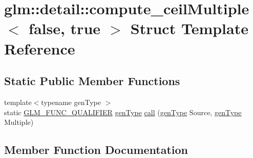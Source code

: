 \hypertarget{structglm_1_1detail_1_1compute__ceil_multiple_3_01false_00_01true_01_4}{}\section{glm\+:\+:detail\+:\+:compute\+\_\+ceil\+Multiple$<$ false, true $>$ Struct Template Reference}
\label{structglm_1_1detail_1_1compute__ceil_multiple_3_01false_00_01true_01_4}
\subsection*{Static Public Member Functions}
\begin{DoxyCompactItemize}
\item 
{\footnotesize template$<$typename gen\+Type $>$ }\\static \hyperlink{setup_8hpp_a33fdea6f91c5f834105f7415e2a64407}{G\+L\+M\+\_\+\+F\+U\+N\+C\+\_\+\+Q\+U\+A\+L\+I\+F\+I\+ER} \hyperlink{structglm_1_1detail_1_1gen_type}{gen\+Type} \hyperlink{structglm_1_1detail_1_1compute__ceil_multiple_3_01false_00_01true_01_4_a065f8762eb2b48c4f746781fac7ab7f7}{call} (\hyperlink{structglm_1_1detail_1_1gen_type}{gen\+Type} Source, \hyperlink{structglm_1_1detail_1_1gen_type}{gen\+Type} Multiple)
\end{DoxyCompactItemize}


\subsection{Member Function Documentation}
\mbox{\label{structglm_1_1detail_1_1compute__ceil_multiple_3_01false_00_01true_01_4_a065f8762eb2b48c4f746781fac7ab7f7}} 
